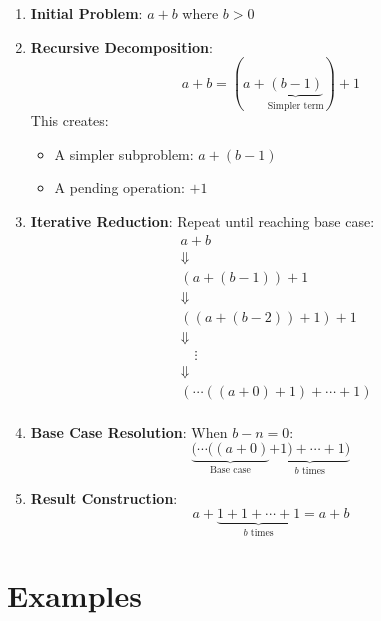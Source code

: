 \documentclass{article}
\begin{document}
\begin{enumerate}
    \item \textbf{Initial Problem}: \(a + b\) where \(b > 0\)

    \item \textbf{Recursive Decomposition}:
          \[
              a + b = (a + \underbrace{(b - 1)}_{\text{Simpler term}}) + 1
          \]
          This creates:
          \begin{itemize}
              \item A simpler subproblem: \(a + (b - 1)\)
              \item A pending operation: \(+ 1\)
          \end{itemize}

    \item \textbf{Iterative Reduction}:
          Repeat until reaching base case:
          \[
              \begin{aligned}
                   & a + b                              \\
                   & \Downarrow                         \\
                   & (a + (b-1)) + 1                    \\
                   & \Downarrow                         \\
                   & ((a + (b-2)) + 1) + 1              \\
                   & \Downarrow                         \\
                   & \quad \vdots                       \\
                   & \Downarrow                         \\
                   & (\cdots((a + 0) + 1) + \cdots + 1) \\
              \end{aligned}
          \]

    \item \textbf{Base Case Resolution}:
          When \(b - n = 0\):
          \[
              \underbrace{(\cdots((a + 0)}_{\text{Base case}} \underbrace{+ 1) + \cdots + 1)}_{b \text{ times}}
          \]

    \item \textbf{Result Construction}:
          \[
              a + \underbrace{1 + 1 + \cdots + 1}_{b \text{ times}} = a + b
          \]
\end{enumerate}

\section{Examples}
\end{document}

